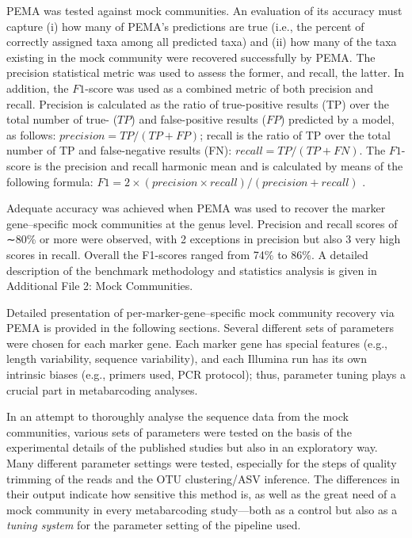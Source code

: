    PEMA was tested against mock communities. 
   An evaluation of its accuracy must capture 
   (i) how many of PEMA's predictions are true (i.e., the percent of correctly assigned taxa among all predicted taxa) and 
   (ii) how many of the taxa existing in the mock community were recovered successfully by PEMA. 
   The precision statistical metric was used to assess the former, and recall, the latter. 
   In addition, the $F1$-score was used as a combined metric of both precision and recall. 
   Precision is calculated as the ratio of true-positive results (TP) over the total number of true- ($TP$) and false-positive results ($FP$) predicted by a model, as follows: $precision = TP/(TP + FP)$; 
   recall is the ratio of TP over the total number of TP and false-negative results (FN): $recall = TP/(TP + FN)$. 
   The $F1$-score is the precision and recall harmonic mean and is calculated by means of the following formula: 
   $F1 = 2 × (precision × recall)/(precision + recall)$ \citep{sammut2011encyclopedia}.

   Adequate accuracy was achieved when PEMA was used to recover the marker gene–specific mock communities at the genus level.
   Precision and recall scores of ∼80\% or more were observed, with 2 exceptions in precision but also 3 very high scores in recall. 
   Overall the F1-scores ranged from 74\% to 86\%. 
   A detailed description of the benchmark methodology and statistics analysis is given in Additional File 2: Mock Communities.

   Detailed presentation of per-marker-gene–specific mock community recovery via PEMA is provided in the following sections. 
   Several different sets of parameters were chosen for each marker gene. 
   Each marker gene has special features (e.g., length variability, sequence variability), and each Illumina run has its own intrinsic biases (e.g., primers used, PCR protocol); 
   thus, parameter tuning plays a crucial part in metabarcoding analyses.

   In an attempt to thoroughly analyse the sequence data from the mock communities, various sets of parameters were tested on the basis of the experimental details of the published studies but also in an exploratory way. 
   Many different parameter settings were tested, especially for the steps of quality trimming of the reads and the OTU clustering/ASV inference. 
   The differences in their output indicate how sensitive this method is, as well as the great need of a mock community in every metabarcoding study—both as a control but also as a \textit{tuning system} for the parameter setting of the pipeline used.

